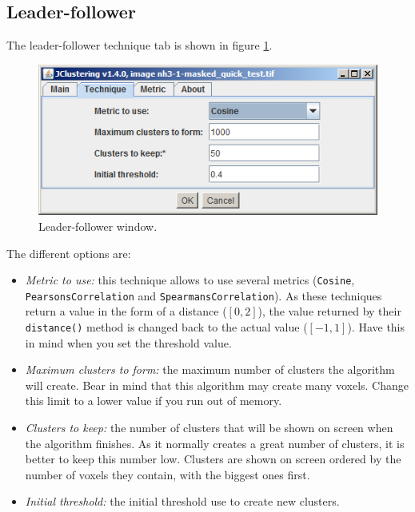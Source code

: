 \documentclass[11pt]{article} %
\begin{document}
\subsection{Leader-follower}

The leader-follower technique tab is shown in figure \ref{fig:leader-follower_window}.

\begin{figure}[h!]
  \centering
    \includegraphics[width=\textwidth]{figures/leader-follower_window}
  \caption{Leader-follower window.}
  \label{fig:leader-follower_window}
\end{figure}

The different options are:

\begin{itemize}
\item {\em Metric to use:} this technique allows to use several metrics ({\tt Cosine}, {\tt PearsonsCorrelation} and 
{\tt SpearmansCorrelation}). As these techniques return a value in the form of a distance ($[0, 2]$), the value returned
by their {\tt distance()} method is changed back to the actual value ($[-1, 1]$). Have this in mind when you set the threshold
value.
\item {\em Maximum clusters to form:} the maximum number of clusters the algorithm will create. Bear in mind that this
algorithm may create many voxels. Change this limit to a lower value if you run out of memory.
\item {\em Clusters to keep:} the number of clusters that will be shown on screen when the algorithm finishes. As it normally
creates a great number of clusters, it is better to keep this number low. Clusters are shown on screen ordered by the number
of voxels they contain, with the biggest ones first.
\item {\em Initial threshold:} the initial threshold use to create new clusters.
\end{itemize}
\end{document}
